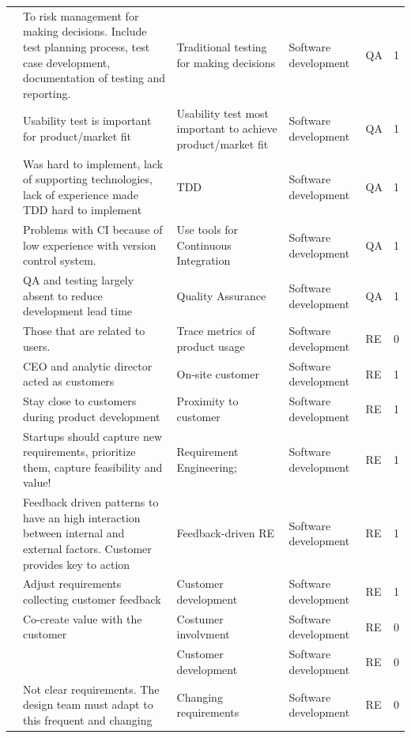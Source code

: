 \documentclass[final,5p,times,twocolumn]{elsarticle}
\begin{document}
\begin{center}
\begin{longtable}{|p{0.36in}|p{2.6in}|p{1.2in}|p{0.9in}|p{0.9in}|p{0.2in}|}
\cite{Mater2000} & To risk management for making decisions. Include test planning process, test case development, documentation of testing and reporting. & Traditional testing for making decisions & Software development & QA    & 1 \\
\cite{Mirel2000} & Usability test is important for product/market fit & Usability test most important to achieve product/market fit & Software development & QA    & 1 \\
\cite{Silva2005} & Was hard to implement, lack of supporting technologies, lack of experience made TDD hard to implement & TDD   & Software development & QA    & 1 \\
\cite{Silva2005} & Problems with CI because of low experience with version control system.  & Use tools for Continuous Integration & Software development & QA    & 1 \\
\cite{Camel1994a} & QA and testing largely absent to reduce development lead time & Quality Assurance & Software development & QA    & 1 \\
\cite{Taipale2010} & Those that are related to users. & Trace metrics of product usage & Software development & RE    & 0 \\
\cite{Tingling2007} & CEO and analytic director acted as customers & On-site customer & Software development & RE    & 1 \\
\cite{Crowne2002} & Stay close to customers during product development & Proximity to customer & Software development & RE    & 1 \\
\cite{Crowne2002} & Startups should capture new requirements, prioritize them, capture feasibility and value! & Requirement Engineering; & Software development & RE    & 1 \\
\cite{Midler2008} & Feedback driven patterns to have an high interaction between internal and external factors. Customer provides key to action & Feedback-driven RE & Software development & RE    & 1 \\
\cite{Deakins2005} & Adjust requirements collecting customer feedback & Customer development & Software development & RE    & 1 \\
\cite{Su-Chan2007} & Co-create value with the customer & Costumer involvment & Software development & RE    & 0 \\
\cite{Taipale2010} &       & Customer development & Software development & RE    & 0 \\
\cite{Tanabian2005} & Not clear requirements. The design team must adapt to this frequent and changing & Changing requirements & Software development & RE    & 0 \\

\end{longtable}
\end{center}
\end{document}
